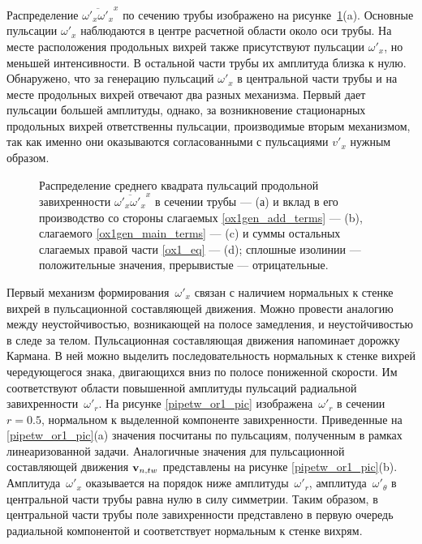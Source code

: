 Распределение $\overline{\omega'_x \omega'_x}^x$ по сечению трубы изображено на рисунке~\ref{ox1gen_pic}(a). Основные пульсации $\omega'_x$ наблюдаются в центре расчетной области около оси трубы. На месте расположения продольных вихрей также присутствуют пульсации $\omega'_x$, но меньшей интенсивности. В остальной части трубы их амплитуда близка к нулю. Обнаружено, что за генерацию пульсаций $\omega'_x$ в центральной части трубы и на месте продольных вихрей отвечают два разных механизма. Первый дает пульсации большей амплитуды, однако, за возникновение стационарных продольных вихрей ответственны пульсации, производимые вторым механизмом, так как именно они оказываются согласованными с пульсациями $v'_x$ нужным образом.


\begin{figure}
\caption{Распределение среднего квадрата пульсаций продольной завихренности $\overline{\omega'_x \omega'_x }^x$ в сечении трубы --- (а) и вклад в его производство со стороны слагаемых \eqref{ox1gen_add_terms} --- (b), слагаемого \eqref{ox1gen_main_terms} --- (c) и суммы остальных слагаемых правой части \eqref{ox1_eq} --- (d); сплошные изолинии --- положительные значения, прерывистые --- отрицательные.}
\label{ox1gen_pic}
\end{figure}


Первый механизм формирования~$\omega'_x$ связан с наличием нормальных к стенке вихрей в пульсационной составляющей движения. Можно провести аналогию между неустойчивостью, возникающей на полосе замедления, и неустойчивостью в следе за телом. Пульсационная составляющая движения напоминает дорожку Кармана. В ней можно выделить последовательность нормальных к стенке вихрей чередующегося знака, двигающихся вниз по полосе пониженной скорости. Им соответствуют области повышенной амплитуды пульсаций радиальной завихренности~$\omega'_r$. На рисунке \ref{pipetw_or1_pic} изображена~$\omega'_r$ в сечении $r = 0.5$, нормальном к выделенной компоненте завихренности. Приведенные на \ref{pipetw_or1_pic}(a) значения посчитаны по пульсациям, полученным в рамках линеаризованной задачи. Аналогичные значения для пульсационной составляющей движения $\mathbf{v}_{n,tw}$ представлены на рисунке \ref{pipetw_or1_pic}(b). Амплитуда~$\omega'_x$ оказывается на порядок ниже амплитуды~$\omega'_r$, амплитуда~$\omega'_\theta$ в центральной части трубы равна нулю в силу симметрии. Таким образом, в центральной части трубы поле завихренности представлено в первую очередь радиальной компонентой и соответствует нормальным к стенке вихрям.

